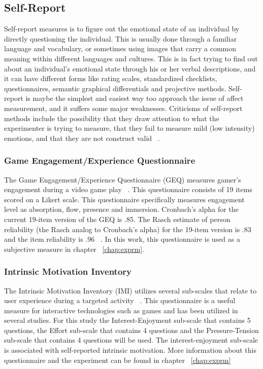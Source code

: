 \subsection{Self-Report}
Self-report measures is to figure out the emotional state of an individual by directly questioning the individual. This is usually done through a familiar language and vocabulary, or sometimes using images that carry a common meaning within different languages and cultures. This is in fact trying to find out about an individual's emotional state through his or her verbal descriptions, and it can have different forms like rating scales, standardized checklists, questionnaires, semantic graphical differentials and projective methods. Self-report is maybe the simplest and easiest way too approach the issue of affect measurement, and it suffers some major weaknesses. Criticisms of self-report methods include the possibility that they draw attention to what the experimenter is trying to measure, that they fail to measure mild (low intensity) emotions, and that they are not construct valid ~\cite{isen2007some}.

\subsubsection{Game Engagement/Experience Questionnaire}
The Game Engagement/Experience Questionnaire (GEQ) measures gamer's engagement during a video game play ~\cite{brockmyer2009development}. This questionnaire consists of 19 items scored on a Likert scale. This questionnaire specifically measures engagement level as absorption, flow, presence and immersion. Cronbach's alpha for the current 19-item version of the GEQ is .85. The Rasch estimate of person reliability (the Rasch analog to Cronbach's alpha) for the 19-item version is .83 and the item reliability is .96 ~\cite{brockmyer2009development}. In this work, this questionnaire is used as a subjective measure in chapter ~\ref{chap:exprm}.

\subsubsection{Intrinsic Motivation Inventory}
The Intrinsic Motivation Inventory (IMI) utilizes several sub-scales that relate to user experience during a targeted activity ~\cite{ryan1983relation}. This questionnaire is a useful measure for interactive technologies such as games and has been utilized in several studies. For this study the Interest-Enjoyment sub-scale that contains 5 questions, the Effort sub-scale that contains 4 questions and the Pressure-Tension sub-scale that contains 4 questions will be used. The interest-enjoyment sub-scale is associated with self-reported intrinsic motivation. More information about this questionnaire and the experiment can be found in chapter ~\ref{chap:exprm}

